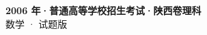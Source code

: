\documentclass[zihao=-4, a4paper]{ctexart}
\begin{document}
\begin{center}
  {\Large\bfseries 2006 年·普通高等学校招生考试·陕西卷理科}\\[4pt]
  {\large 数学 · 试题版}
\end{center}
\medskip
{}

\end{document}
